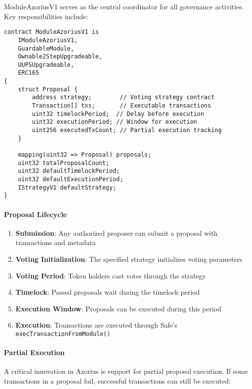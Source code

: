 \documentclass[11pt,a4paper]{article}
\begin{document}
ModuleAzoriusV1 serves as the central coordinator for all governance activities. Key responsibilities include:

\begin{lstlisting}[caption=ModuleAzoriusV1 Core Structure]
contract ModuleAzoriusV1 is
    IModuleAzoriusV1,
    GuardableModule,
    Ownable2StepUpgradeable,
    UUPSUpgradeable,
    ERC165
{
    struct Proposal {
        address strategy;        // Voting strategy contract
        Transaction[] txs;       // Executable transactions
        uint32 timelockPeriod;  // Delay before execution
        uint32 executionPeriod; // Window for execution
        uint256 executedTxCount; // Partial execution tracking
    }

    mapping(uint32 => Proposal) proposals;
    uint32 totalProposalCount;
    uint32 defaultTimelockPeriod;
    uint32 defaultExecutionPeriod;
    IStrategyV1 defaultStrategy;
}
\end{lstlisting}

\paragraph{Proposal Lifecycle}

\begin{enumerate}
    \item \textbf{Submission}: Any authorized proposer can submit a proposal with transactions and metadata
    \item \textbf{Voting Initialization}: The specified strategy initializes voting parameters
    \item \textbf{Voting Period}: Token holders cast votes through the strategy
    \item \textbf{Timelock}: Passed proposals wait during the timelock period
    \item \textbf{Execution Window}: Proposals can be executed during this period
    \item \textbf{Execution}: Transactions are executed through Safe's \texttt{execTransactionFromModule()}
\end{enumerate}

\paragraph{Partial Execution}

A critical innovation in Azorius is support for partial proposal execution. If some transactions in a proposal fail, successful transactions can still be executed:
\end{document}
